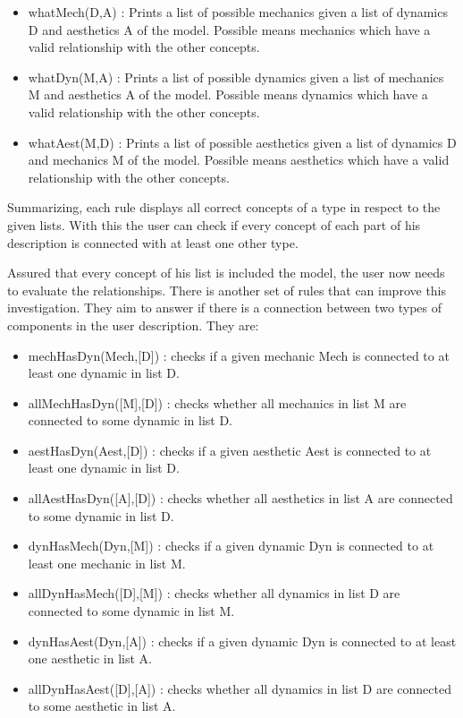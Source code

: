 \begin{itemize}
    \item whatMech(D,A) : Prints a list of possible mechanics given a list of dynamics D and aesthetics A of the model. Possible means mechanics which have a valid relationship with the other concepts.
    \item whatDyn(M,A) : Prints a list of possible dynamics given a list of mechanics M and aesthetics A of the model. Possible means dynamics which have a valid relationship with the other concepts.
    \item whatAest(M,D) : Prints a list of possible aesthetics given a list of dynamics D and mechanics M of the model. Possible means aesthetics which have a valid relationship with the other concepts.
\end{itemize}

Summarizing, each rule displays all correct concepts of a type in respect to the given lists. With this the user can check if every concept of each part of his description is connected with at least one other type.

Assured that every concept of his list is included the model, the user now needs to evaluate the relationships. There is another set of rules that can improve this investigation. They aim to answer if there is a connection between two types of components in the user description. They are:

\begin{itemize}
    \item mechHasDyn(Mech,[D]) : checks if a given mechanic Mech is connected to at least one dynamic in list D.
    \item allMechHasDyn([M],[D]) : checks whether all mechanics in list M are connected to some dynamic in list D.
    
    \item aestHasDyn(Aest,[D]) : checks if a given aesthetic Aest is connected to at least one dynamic in list D.
    \item allAestHasDyn([A],[D]) : checks whether all aesthetics in list A are connected to some dynamic in list D.
    
    \item dynHasMech(Dyn,[M]) : checks if a given dynamic Dyn is connected to at least one mechanic in list M.
    \item allDynHasMech([D],[M]) : checks whether all dynamics in list D are connected to some dynamic in list M.
    
    \item dynHasAest(Dyn,[A]) : checks if a given dynamic Dyn is connected to at least one aesthetic in list A.
    \item allDynHasAest([D],[A]) : checks whether all dynamics in list D are connected to some aesthetic in list A.
    
\end{itemize}

